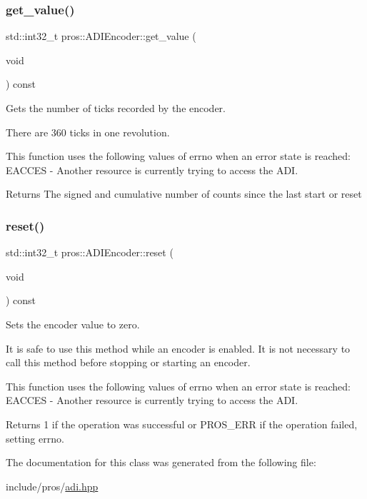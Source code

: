 \subsubsection{\texorpdfstring{get\_value()}{get\_value()}}
{\footnotesize\ttfamily std\+::int32\+\_\+t pros\+::\+A\+D\+I\+Encoder\+::get\+\_\+value (\begin{DoxyParamCaption}\item[{void}]{ }\end{DoxyParamCaption}) const}



Gets the number of ticks recorded by the encoder. 

There are 360 ticks in one revolution.

This function uses the following values of errno when an error state is reached\+: E\+A\+C\+C\+ES -\/ Another resource is currently trying to access the A\+DI.

\begin{DoxyReturn}{Returns}
The signed and cumulative number of counts since the last start or reset 
\end{DoxyReturn}
\mbox{\label{classpros_1_1ADIEncoder_a38a555946a841150b203f940b4b44cc8}} 
\subsubsection{\texorpdfstring{reset()}{reset()}}
{\footnotesize\ttfamily std\+::int32\+\_\+t pros\+::\+A\+D\+I\+Encoder\+::reset (\begin{DoxyParamCaption}\item[{void}]{ }\end{DoxyParamCaption}) const}



Sets the encoder value to zero. 

It is safe to use this method while an encoder is enabled. It is not necessary to call this method before stopping or starting an encoder.

This function uses the following values of errno when an error state is reached\+: E\+A\+C\+C\+ES -\/ Another resource is currently trying to access the A\+DI.

\begin{DoxyReturn}{Returns}
1 if the operation was successful or P\+R\+O\+S\+\_\+\+E\+RR if the operation failed, setting errno. 
\end{DoxyReturn}


The documentation for this class was generated from the following file\+:\begin{DoxyCompactItemize}
\item 
include/pros/\mbox{\hyperlink{adi_8hpp}{adi.\+hpp}}\end{DoxyCompactItemize}
